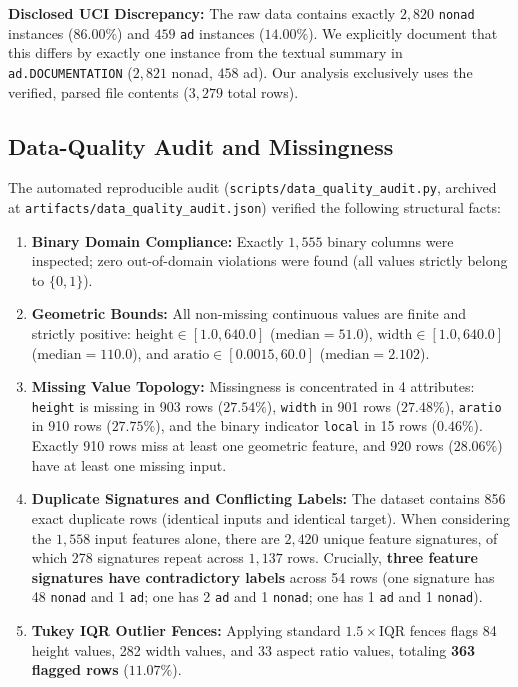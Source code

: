 \documentclass[11pt,a4paper]{article}
\begin{document}
\noindent\textbf{Disclosed UCI Discrepancy:} The raw data contains exactly $2{,}820$ \texttt{nonad} instances ($86.00\%$) and $459$ \texttt{ad} instances ($14.00\%$). We explicitly document that this differs by exactly one instance from the textual summary in \texttt{ad.DOCUMENTATION} ($2{,}821$ nonad, $458$ ad). Our analysis exclusively uses the verified, parsed file contents ($3{,}279$ total rows).

\subsection{Data-Quality Audit and Missingness}
The automated reproducible audit (\texttt{scripts/data\_quality\_audit.py}, archived at \texttt{artifacts/data\_quality\_audit.json}) verified the following structural facts:
\begin{enumerate}[noitemsep,topsep=2pt]
    \item \textbf{Binary Domain Compliance:} Exactly $1{,}555$ binary columns were inspected; zero out-of-domain violations were found (all values strictly belong to $\{0, 1\}$).
    \item \textbf{Geometric Bounds:} All non-missing continuous values are finite and strictly positive:
    $\text{height} \in [1.0, 640.0]$ ($\text{median} = 51.0$), $\text{width} \in [1.0, 640.0]$ ($\text{median} = 110.0$), and $\text{aratio} \in [0.0015, 60.0]$ ($\text{median} = 2.102$).
    \item \textbf{Missing Value Topology:} Missingness is concentrated in 4 attributes: \texttt{height} is missing in 903 rows ($27.54\%$), \texttt{width} in 901 rows ($27.48\%$), \texttt{aratio} in 910 rows ($27.75\%$), and the binary indicator \texttt{local} in 15 rows ($0.46\%$). Exactly 910 rows miss at least one geometric feature, and 920 rows ($28.06\%$) have at least one missing input.
    \item \textbf{Duplicate Signatures and Conflicting Labels:} The dataset contains 856 exact duplicate rows (identical inputs and identical target). When considering the $1{,}558$ input features alone, there are $2{,}420$ unique feature signatures, of which 278 signatures repeat across $1{,}137$ rows. Crucially, \textbf{three feature signatures have contradictory labels} across 54 rows (one signature has 48 \texttt{nonad} and 1 \texttt{ad}; one has 2 \texttt{ad} and 1 \texttt{nonad}; one has 1 \texttt{ad} and 1 \texttt{nonad}).
    \item \textbf{Tukey IQR Outlier Fences:} Applying standard $1.5\times\text{IQR}$ fences flags 84 height values, 282 width values, and 33 aspect ratio values, totaling \textbf{363 flagged rows} ($11.07\%$).
\end{enumerate}
\end{document}
